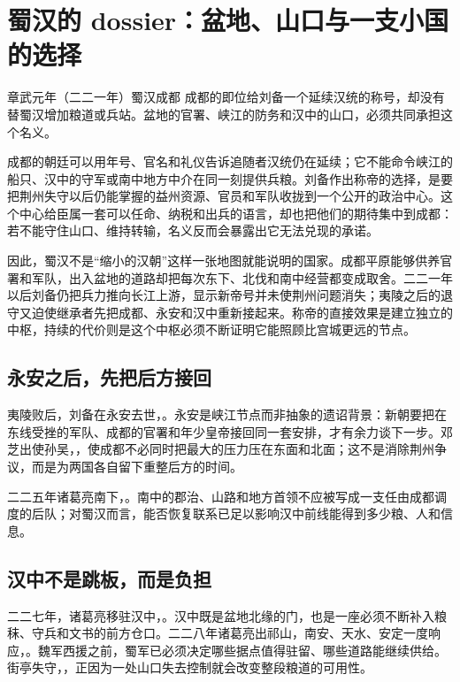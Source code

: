 \section{蜀汉的 dossier：盆地、山口与一支小国的选择}
\label{sec:shu-expeditions}

\begin{event}{}{章武元年（二二一年）}{蜀汉}{成都}
成都的即位给刘备一个延续汉统的称号，却没有替蜀汉增加粮道或兵站。盆地的官署、峡江的防务和汉中的山口，必须共同承担这个名义。

成都的朝廷可以用年号、官名和礼仪告诉追随者汉统仍在延续；它不能命令峡江的船只、汉中的守军或南中地方中介在同一刻提供兵粮。刘备作出称帝的选择，是要把荆州失守以后仍能掌握的益州资源、官员和军队收拢到一个公开的政治中心。这个中心给臣属一套可以任命、纳税和出兵的语言，却也把他们的期待集中到成都：若不能守住山口、维持转输，名义反而会暴露出它无法兑现的承诺。

因此，蜀汉不是“缩小的汉朝”这样一张地图就能说明的国家。成都平原能够供养官署和军队，出入盆地的道路却把每次东下、北伐和南中经营都变成取舍。二二一年以后刘备仍把兵力推向长江上游，显示新帝号并未使荆州问题消失；夷陵之后的退守又迫使继承者先把成都、永安和汉中重新接起来。称帝的直接效果是建立独立的中枢，持续的代价则是这个中枢必须不断证明它能照顾比宫城更远的节点。
\end{event}

\subsection{永安之后，先把后方接回}

夷陵败后，刘备在永安去世，。永安是峡江节点而非抽象的遗诏背景：新朝要把在东线受挫的军队、成都的官署和年少皇帝接回同一套安排，才有余力谈下一步。邓芝出使孙吴，，使成都不必同时把最大的压力压在东面和北面；这不是消除荆州争议，而是为两国各自留下重整后方的时间。

二二五年诸葛亮南下，。南中的郡治、山路和地方首领不应被写成一支任由成都调度的后队；对蜀汉而言，能否恢复联系已足以影响汉中前线能得到多少粮、人和信息。

\subsection{汉中不是跳板，而是负担}

二二七年，诸葛亮移驻汉中，。汉中既是盆地北缘的门，也是一座必须不断补入粮秣、守兵和文书的前方仓口。二二八年诸葛亮出祁山，南安、天水、安定一度响应，。魏军西援之前，蜀军已必须决定哪些据点值得驻留、哪些道路能继续供给。街亭失守，，正因为一处山口失去控制就会改变整段粮道的可用性。

